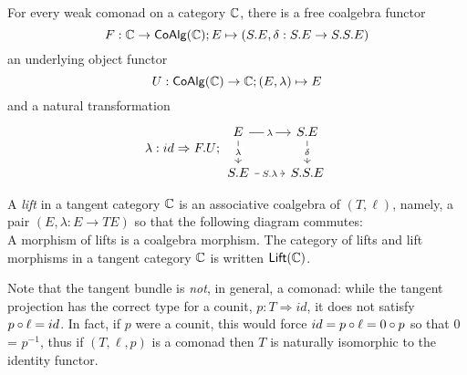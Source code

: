 \begin{lemma}
  For every weak comonad on a category $\mathbb{C}$, there is a free coalgebra functor
  \[
      F: \mathbb{C} \to \mathsf{CoAlg}(\mathbb{C}); E \mapsto (S.E, \delta:S.E \to S.S.E)
  \]  
  an underlying object functor
  \[
      U: \mathsf{CoAlg}(\mathbb{C}) \to \mathbb{C}; (E, \lambda) \mapsto E
  \]
  and a natural transformation
  \[
      \lambda:id \Rightarrow F.U; %
      \begin{tikzcd}
        E & S.E \\
        S.E & S.S.E
        \arrow["\lambda"{description}, from=1-1, to=1-2]
        \arrow["{S.\lambda}"{description}, from=2-1, to=2-2]
        \arrow["\lambda"{description}, from=1-1, to=2-1]
        \arrow["\delta"{description}, from=1-2, to=2-2]
      \end{tikzcd}
  \]
\end{lemma}
\begin{definition}\label{def:lift}
  A \emph{lift} in a tangent category $\mathbb{C}$ is an associative coalgebra of $(T,\ell)$, namely, a pair $(E, \lambda: E \to TE)$ so that the following diagram commutes:
  \[
    
  \]
  A morphism of lifts is a coalgebra morphism. The category of lifts and lift morphisms in a tangent category $\mathbb{C}$ is written $\mathsf{Lift}(\mathbb{C})$.
\end{definition}
Note that the tangent bundle is \emph{not}, in general, a comonad: while the tangent projection has the correct type for a counit, $p:T \Rightarrow id$, it does not satisfy $p \circ \ell = id$. In fact, if $p$ were a counit, this would force $id = p \circ \ell = 0 \circ p$ so that $0$ = $p^{-1}$, thus if $(T,\ell,p)$ is a comonad then $T$ is naturally isomorphic to the identity functor.
